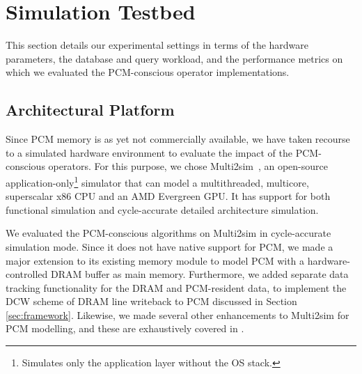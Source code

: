 \section{Simulation Testbed}
\label{sec:exp}

This section details our experimental settings in terms of the hardware
parameters, the database and query workload, and the performance metrics
on which we evaluated the PCM-conscious operator implementations.



\subsection{Architectural Platform}
Since PCM memory is as yet not commercially available, we
have taken recourse to a simulated hardware environment to
evaluate the impact of the PCM-conscious operators.  For this
purpose, we chose Multi2sim~\cite{multi2sim}, an open-source
application-only\footnote{Simulates only the application layer without
the OS stack.} simulator that can model a multithreaded, multicore,
superscalar x86 CPU and an AMD Evergreen GPU. It has support for both
functional simulation and cycle-accurate detailed architecture simulation.

We evaluated the PCM-conscious algorithms on Multi2sim in cycle-accurate simulation
mode. Since it does not have native support for PCM, we made a major
extension to its existing memory module to model PCM with a hardware-controlled DRAM buffer as main memory. Furthermore, we added separate data tracking functionality
for the DRAM and PCM-resident data, to implement the DCW scheme of DRAM line writeback to PCM discussed in Section \ref{sec:framework}. Likewise, we made several other enhancements to Multi2sim for PCM modelling, and these are exhaustively covered in \cite{techreport}.

